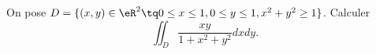
\begin{exercice}\label{exoOutilsMath-0104}

    On pose $D=\{ (x,y)\in\eR^2\tq 0\leq x\leq 1,0\leq y\leq 1,x^2+y^2\geq1 \}$. Calculer
    \begin{equation}
        \iint_{D}\frac{ xy }{ 1+x^2+y^2 }dxdy.
    \end{equation}

\end{exercice}
